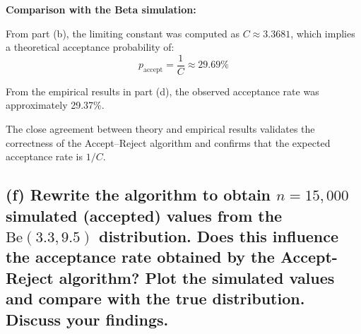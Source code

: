 \vspace{1em}
\textbf{Comparison with the Beta simulation:}

From part (b), the limiting constant was computed as $C \approx 3.3681$, which implies a theoretical acceptance probability of:
\[
p_{\text{accept}} = \frac{1}{C} \approx 29.69\%
\]

From the empirical results in part (d), the observed acceptance rate was approximately 29.37\%.

The close agreement between theory and empirical results validates the correctness of the Accept–Reject algorithm and confirms that the expected acceptance rate is \(1/C\).














\newpage
\subsection*{(f) Rewrite the algorithm to obtain $n = 15,\!000$ simulated (accepted) values from the $\text{Be}(3.3, 9.5)$ distribution. Does this influence the acceptance rate obtained by the Accept-Reject algorithm? Plot the simulated values and compare with the true distribution. Discuss your findings.}

